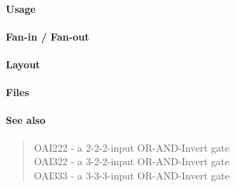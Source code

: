 \paragraph{Usage}

\paragraph{Fan-in / Fan-out}

\paragraph{Layout}

\paragraph{Files}

\paragraph{See also}
\begin{quote}
    OAI222 - a 2-2-2-input OR-AND-Invert gate \\
    OAI322 - a 3-2-2-input OR-AND-Invert gate \\
    OAI333 - a 3-3-3-input OR-AND-Invert gate
\end{quote}
